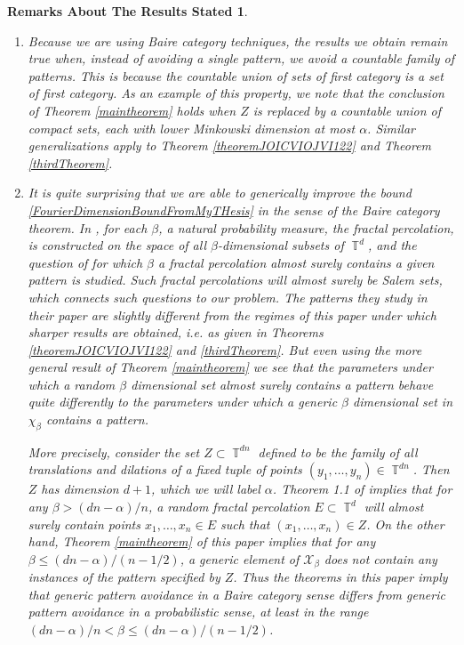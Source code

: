 \documentclass[dvipsnames,letterpaper,12pt]{article}
\numberwithin{equation}{section}
\DeclareMathOperator{\TT}{\mathbb{T}}
\newtheorem*{remarksaboutresults}{Remarks About The Results Stated}
\numberwithin{theorem}{section}
\begin{document}
\begin{remarksaboutresults}
    \ 
    \begin{enumerate}
        \item Because we are using Baire category techniques, the results we obtain remain true when, instead of avoiding a single pattern, we avoid a countable family of patterns. This is because the countable union of sets of first category is a set of first category. As an example of this property, we note that the conclusion of Theorem \ref{maintheorem} holds when $Z$ is replaced by a \emph{countable union} of compact sets, each with lower Minkowski dimension at most $\alpha$. Similar generalizations apply to Theorem \ref{theoremJOICVIOJVI122} and Theorem \ref{thirdTheorem}.

        \item It is quite surprising that we are able to generically improve the bound \eqref{FourierDimensionBoundFromMyTHesis} in the sense of the Baire category theorem. In \cite{Schmerkin2}, for each $\beta$, a natural probability measure, the \emph{fractal percolation}, is constructed on the space of all $\beta$-dimensional subsets of $\TT^d$, and the question of for which $\beta$ a fractal percolation almost surely contains a given pattern is studied. Such fractal percolations will almost surely be Salem sets, which connects such questions to our problem. The patterns they study in their paper are slightly different from the regimes of this paper under which sharper results are obtained, i.e. as given in Theorems \ref{theoremJOICVIOJVI122} and \ref{thirdTheorem}. But even using the more general result of Theorem \ref{maintheorem} we see that the parameters under which a random $\beta$ dimensional set almost surely contains a pattern behave quite differently to the parameters under which a generic $\beta$ dimensional set in $\chi_\beta$ contains a pattern.

        More precisely, consider the set $Z \subset \TT^{dn}$ defined to be the family of all translations and dilations of a fixed tuple of points $(y_1,\dots,y_n) \in \TT^{dn}$. Then $Z$ has dimension $d+1$, which we will label $\alpha$. Theorem 1.1 of \cite{Schmerkin2} implies that for any $\beta > (dn - \alpha)/n$, a random fractal percolation $E \subset \TT^d$ will almost surely contain points $x_1,\dots,x_n \in E$ such that $(x_1,\dots,x_n) \in Z$. On the other hand, Theorem \ref{maintheorem} of this paper implies that for any $\beta \leq (dn - \alpha)/(n-1/2)$, a generic element of $\mathcal{X}_\beta$ \emph{does not} contain any instances of the pattern specified by $Z$. Thus the theorems in this paper imply that generic pattern avoidance in a Baire category sense differs from generic pattern avoidance in a probabilistic sense, at least in the range $(dn - \alpha)/n < \beta \leq (dn - \alpha)/(n - 1/2)$.


\end{enumerate}
\end{remarksaboutresults}
\end{document}
